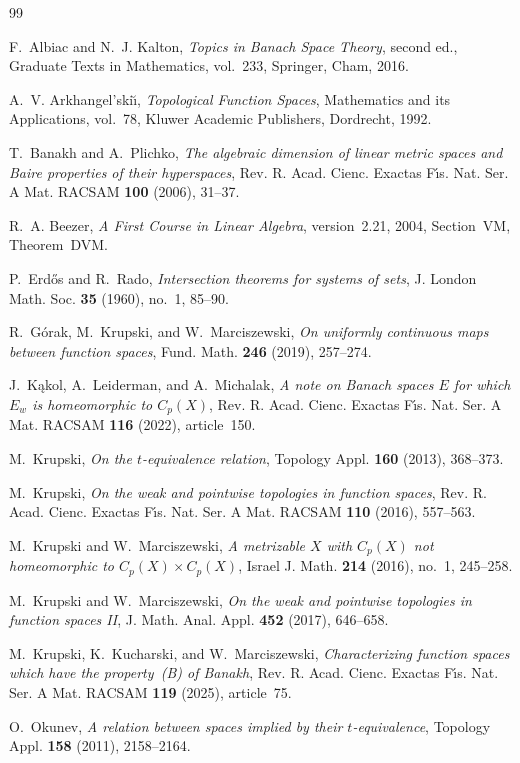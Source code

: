 \documentclass[a4paper]{amsart}
\begin{document}
\begin{thebibliography}{99}

F.~Albiac and N.~J. Kalton,
\emph{Topics in Banach Space Theory}, second ed.,
Graduate Texts in Mathematics, vol.~233, Springer, Cham, 2016.

A.~V. Arkhangel'ski\u{\i},
\emph{Topological Function Spaces},
Mathematics and its Applications, vol.~78, Kluwer Academic Publishers,
Dordrecht, 1992.

T.~Banakh and A.~Plichko,
\emph{The algebraic dimension of linear metric spaces and Baire
properties of their hyperspaces},
Rev. R. Acad. Cienc. Exactas F\'{\i}s. Nat. Ser. A Mat. RACSAM
\textbf{100} (2006), 31--37.

R.~A. Beezer,
\emph{A First Course in Linear Algebra}, version~2.21, 2004,
Section~VM, Theorem~DVM.

P.~Erd\H{o}s and R.~Rado,
\emph{Intersection theorems for systems of sets},
J. London Math. Soc. \textbf{35} (1960), no.~1, 85--90.

R.~G\'{o}rak, M.~Krupski, and W.~Marciszewski,
\emph{On uniformly continuous maps between function spaces},
Fund. Math. \textbf{246} (2019), 257--274.

J.~K\k{a}kol, A.~Leiderman, and A.~Michalak,
\emph{A note on Banach spaces $E$ for which $E_w$ is homeomorphic to
$C_p(X)$},
Rev. R. Acad. Cienc. Exactas F\'{\i}s. Nat. Ser. A Mat. RACSAM
\textbf{116} (2022), article~150.

M.~Krupski,
\emph{On the $t$-equivalence relation},
Topology Appl. \textbf{160} (2013), 368--373.

M.~Krupski,
\emph{On the weak and pointwise topologies in function spaces},
Rev. R. Acad. Cienc. Exactas F\'{\i}s. Nat. Ser. A Mat. RACSAM
\textbf{110} (2016), 557--563.

M.~Krupski and W.~Marciszewski,
\emph{A metrizable $X$ with $C_p(X)$ not homeomorphic to
$C_p(X)\times C_p(X)$},
Israel J. Math. \textbf{214} (2016), no.~1, 245--258.

M.~Krupski and W.~Marciszewski,
\emph{On the weak and pointwise topologies in function spaces II},
J. Math. Anal. Appl. \textbf{452} (2017), 646--658.

M.~Krupski, K.~Kucharski, and W.~Marciszewski,
\emph{Characterizing function spaces which have the property~(B) of
Banakh},
Rev. R. Acad. Cienc. Exactas F\'{\i}s. Nat. Ser. A Mat. RACSAM
\textbf{119} (2025), article~75.

O.~Okunev,
\emph{A relation between spaces implied by their $t$-equivalence},
Topology Appl. \textbf{158} (2011), 2158--2164.

\end{thebibliography}
\end{document}
